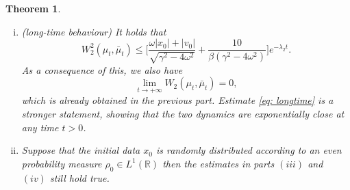 \documentclass[a4paper,twoside]{article}      %
\newtheorem{theorem}{Theorem}[section]
\theoremstyle{definition}
\begin{document}
\begin{theorem}
\begin{enumerate}[(i)]
$$
W_2(\mu_t,\mu_\infty),~ W_2(\bar{\mu}_t,\bar{\mu}_\infty)\leq C e^{-\lambda_2 t},
$$
where 
$$
\mu_\infty=\bar{\mu}_\infty=\mathcal{N}\Big(0, \frac{1}{\beta\omega^2}\Big).
$$
This result shows that the original dynamics and the reduced one not only share the same equilibrium, they have the same rates of convergence to equilibrium in the Wasserstein distance.
\item (long-time behaviour) It holds that
\begin{equation}
\label{eq: longtime}
W_2^2(\mu_t,\bar{\mu}_t)\leq \Big[\frac{\omega|x_0|+|v_0|}{\sqrt{\gamma^2-4\omega^2}}+\frac{10}{\beta(\gamma^2-4\omega^2)}\Big]e^{-\lambda_2 t}.
\end{equation}
As a consequence of this, we also have
$$
\lim_{t\rightarrow +\infty}W_2(\mu_t,\bar{\mu}_t)=0,
$$
which is already obtained in the previous part. Estimate \eqref{eq: longtime} is a stronger statement, showing that the two dynamics are exponentially close at any time $t>0$.
\item Suppose that the initial data $x_0$ is randomly distributed according to an even probability measure $\rho_0\in L^1(\mathbb{R})$ then the estimates in parts $(iii)$ and $(iv)$ still hold true.
\end{enumerate}
\end{theorem}
\end{document}
